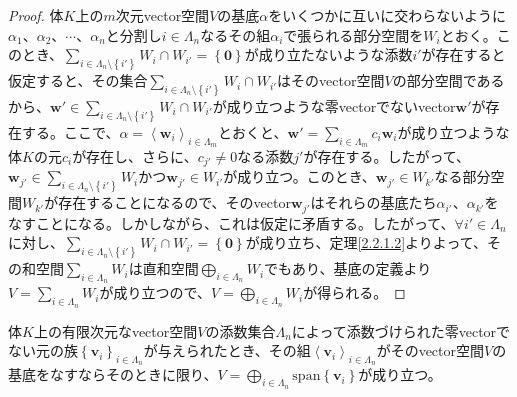 \documentclass[dvipdfmx]{jsarticle}
\begin{document}
\begin{proof}
体$K$上の$m$次元vector空間$V$の基底$\alpha$をいくつかに互いに交わらないように$\alpha_{1}$、$\alpha_{2}$、$\cdots$、$\alpha_{n}$と分割し$i \in \varLambda_{n}$なるその組$\alpha_{i}$で張られる部分空間を$W_{i}$とおく。このとき、$\sum_{i \in \varLambda_{n} \setminus \left\{ i' \right\}} W_{i} \cap W_{i'} = \left\{ \mathbf{0} \right\}$が成り立たないような添数$i'$が存在すると仮定すると、その集合$\sum_{i \in \varLambda_{n} \setminus \left\{ i' \right\}} W_{i} \cap W_{i'}$はそのvector空間$V$の部分空間であるから、$\mathbf{w}' \in \sum_{i \in \varLambda_{n} \setminus \left\{ i' \right\}} W_{i} \cap W_{i'}$が成り立つような零vectorでないvector$\mathbf{w}'$が存在する。ここで、$\alpha = \left\langle \mathbf{w}_{i} \right\rangle_{i \in \varLambda_{m}}$とおくと、$\mathbf{w}' = \sum_{i \in \varLambda_{m}} {c_{i}\mathbf{w}_{i}}$が成り立つような体$K$の元$c_{i}$が存在し、さらに、$c_{j'} \neq 0$なる添数$j'$が存在する。したがって、$\mathbf{w}_{j'} \in \sum_{i \in \varLambda_{n} \setminus \left\{ i' \right\}} W_{i}$かつ$\mathbf{w}_{j'} \in W_{i'}$が成り立つ。このとき、$\mathbf{w}_{j'} \in W_{k'}$なる部分空間$W_{k'}$が存在することになるので、そのvector$\mathbf{w}_{j'}$はそれらの基底たち$\alpha_{i'}$、$\alpha_{k'}$をなすことになる。しかしながら、これは仮定に矛盾する。したがって、$\forall i' \in \varLambda_{n}$に対し、$\sum_{i \in \varLambda_{n} \setminus \left\{ i' \right\}} W_{i} \cap W_{i'} = \left\{ \mathbf{0} \right\}$が成り立ち、定理\ref{2.2.1.2}よりよって、その和空間$\sum_{i \in \varLambda_{n}} W_{i}$は直和空間$\bigoplus_{i \in \varLambda_{n}} W_{i}$でもあり、基底の定義より$V = \sum_{i \in \varLambda_{n}} W_{i}$が成り立つので、$V = \bigoplus_{i \in \varLambda_{n}} W_{i}$が得られる。
\end{proof}
\begin{thm}\label{2.2.1.7}
体$K$上の有限次元なvector空間$V$の添数集合$\varLambda_{n}$によって添数づけられた零vectorでない元の族$\left\{ \mathbf{v}_{i} \right\}_{i \in \varLambda_{n}}$が与えられたとき、その組$\left\langle \mathbf{v}_{i} \right\rangle_{i \in \varLambda_{n}}$がそのvector空間$V$の基底をなすならそのときに限り、$V = \bigoplus_{i \in \varLambda_{n}} {{\mathrm{span} }\left\{ \mathbf{v}_{i} \right\}}$が成り立つ。
\end{thm}
\end{document}
